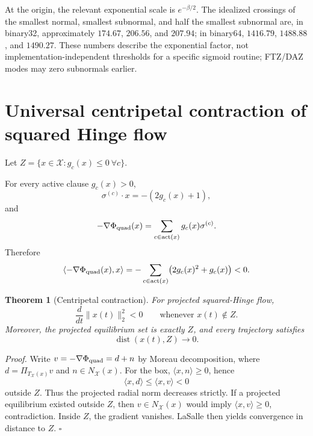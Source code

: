 \documentclass[11pt,a4paper]{article}
\newtheorem{theorem}{Theorem}[section]
\newcommand{\X}{\mathcal X}
\begin{document}
At the origin, the relevant exponential scale is $e^{-\beta/2}$. The idealized crossings of the smallest normal, smallest subnormal, and half the smallest subnormal are, in binary32, approximately $174.67$, $206.56$, and $207.94$; in binary64, $1416.79$, $1488.88$, and $1490.27$. These numbers describe the exponential factor, not implementation-independent thresholds for a specific sigmoid routine; FTZ/DAZ modes may zero subnormals earlier.

\section{Universal centripetal contraction of squared Hinge flow}
Let $Z=\{x\in\X:g_c(x)\le0\ \forall c\}$.

For every active clause $g_c(x)>0$,
\[
\sigma^{(c)}\cdot x=-(2g_c(x)+1),
\]
and
\[
-\nabla\Phi_{\rm quad}(x)=\sum_{c\in\mathrm{act}(x)}g_c(x)\sigma^{(c)}.
\]
Therefore
\begin{equation}
\langle-\nabla\Phi_{\rm quad}(x),x\rangle=-\sum_{c\in\mathrm{act}(x)}\bigl(2g_c(x)^2+g_c(x)\bigr)<0.
\end{equation}

\begin{theorem}[Centripetal contraction]
For projected squared-Hinge flow,
\[
\frac{d}{dt}\|x(t)\|_2^2<0\qquad\text{whenever }x(t)\notin Z.
\]
Moreover, the projected equilibrium set is exactly $Z$, and every trajectory satisfies
\[
\operatorname{dist}(x(t),Z)\to0.
\]
\end{theorem}

\noindent\textit{Proof.} Write $v=-\nabla\Phi_{\rm quad}=d+n$ by Moreau decomposition, where $d=\Pi_{T_\X(x)}v$ and $n\in N_\X(x)$. For the box, $\langle x,n\rangle\ge0$, hence
\[
\langle x,d\rangle\le\langle x,v\rangle<0
\]
outside $Z$. Thus the projected radial norm decreases strictly. If a projected equilibrium existed outside $Z$, then $v\in N_\X(x)$ would imply $\langle x,v\rangle\ge0$, contradiction. Inside $Z$, the gradient vanishes. LaSalle then yields convergence in distance to $Z$. \hfill$\square$
\end{document}
